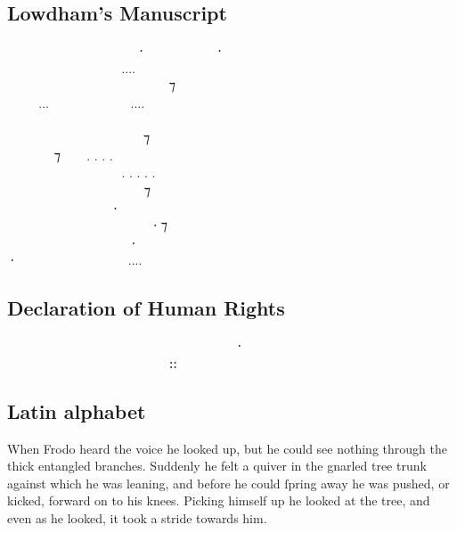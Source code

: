 \documentclass[11pt,a4paper]{article}
\begin{document}
\subsection*{Lowdham’s Manuscript}
\tengtelc
  ‍   ⸱‍  ‍ ⸱ \\
    ‍....  ‍  \\
  ‍   ‍ ‍ ⁊ ‍  \\
...  ....   \\
         ‍ \\
 ‍ ‍‍   ⁊  ‍ ‍ \\
 ‍ ⁊  . . . .  ‍ ‍‍   \\
   ‍ . . . . . ‍ ‍   \\
      ⁊    \\
   ‍⸱‍   ‍  \\
     ‍⸱ ⁊  ‍ \\
    ⸱    \\
⸱  ‍  .... ‍‍    \\

\subsection*{Declaration of Human Rights}
\tengtelcb
\begin{center}
           ⸱                   ⸬
\end{center}

\subsection*{Latin alphabet}
\tengtelcb
When Frodo heard the voice he looked up, but he could
see nothing through the thick entangled branches.
Suddenly he felt a quiver in the gnarled tree trunk
against which he was leaning, and before he could
ſpring away he was pushed, or kicked, forward on to
his knees. Picking himself up he looked at the tree,
and even as he looked, it took a stride towards him.
\end{document}
